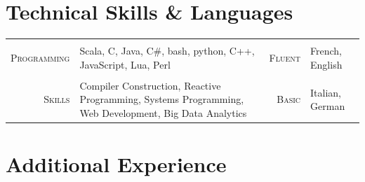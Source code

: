 \documentclass[a4paper,11pt]{article} %
\begin{document}
\pagebreak
{}


\section{Technical Skills \& Languages}
\begin{center}

\vspace{-0.3cm}
\begin{tabularx}{\textwidth}{rX|rl}

& & & \\
\textsc{\large{Programming}} & Scala, C, Java, C\#, bash, python, C++, JavaScript,
Lua, Perl &
\textsc{\large{Fluent}} & French, English \\
& & & \\
\textsc{\large{Skills}} & Compiler Construction, Reactive Programming, 
Systems Programming, Web Development, Big Data Analytics &
\textsc{\large{Basic}} & Italian, German \\

\end{tabularx}

\end{center}


\section{Additional Experience}
\end{document}
